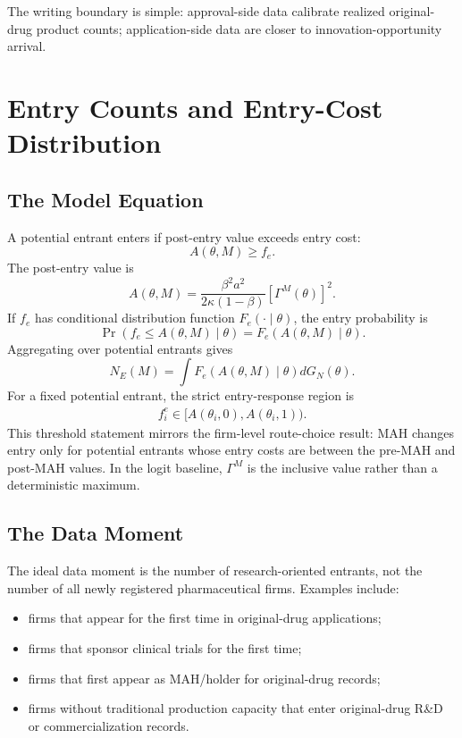 \documentclass[12pt]{article}
\newcommand{\1}{\mathbf{1}}
\begin{document}
The writing boundary is simple: approval-side data calibrate realized original-drug product counts; application-side data are closer to innovation-opportunity arrival.

\section{Entry Counts and Entry-Cost Distribution}

\subsection{The Model Equation}

A potential entrant enters if post-entry value exceeds entry cost:
\[
    A(\theta,M)\ge f_e.
\]
The post-entry value is
\[
    A(\theta,M)
    =
    \frac{\beta^2 a^2}{2\kappa(1-\beta)}
    [\Gamma^M(\theta)]^2.
\]
If $f_e$ has conditional distribution function $F_e(\cdot\mid\theta)$, the entry probability is
\[
    \Pr(f_e\le A(\theta,M)\mid\theta)
    =
    F_e(A(\theta,M)\mid\theta).
\]
Aggregating over potential entrants gives
\[
    N_E(M)=
    \int
    F_e(A(\theta,M)\mid\theta)
    dG_N(\theta).
\]
For a fixed potential entrant, the strict entry-response region is
\begin{align*}
    f_i^e
    \in
    [A(\theta_i,0),A(\theta_i,1)).
\end{align*}
This threshold statement mirrors the firm-level route-choice result: MAH changes entry only for potential entrants whose entry costs are between the pre-MAH and post-MAH values. In the logit baseline, $\Gamma^M$ is the inclusive value rather than a deterministic maximum.

\subsection{The Data Moment}

The ideal data moment is the number of research-oriented entrants, not the number of all newly registered pharmaceutical firms. Examples include:
\begin{itemize}[leftmargin=2em]
    \item firms that appear for the first time in original-drug applications;
    \item firms that sponsor clinical trials for the first time;
    \item firms that first appear as MAH/holder for original-drug records;
    \item firms without traditional production capacity that enter original-drug R\&D or commercialization records.
\end{itemize}
\end{document}
